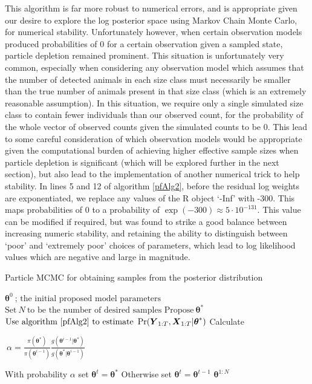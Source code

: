 \documentclass[a4paper,12pt]{article}
\begin{document}
This algorithm is far more robust to numerical errors, and is appropriate given our desire to explore the log posterior space using Markov Chain Monte Carlo, for numerical stability. Unfortunately however, when certain observation models produced probabilities of 0 for a certain observation given a sampled state, particle depletion remained prominent. This situation is unfortunately very common, especially when considering any observation model which assumes that the number of detected animals in each size class must necessarily be smaller than the true number of animals present in that size class (which is an extremely reasonable assumption). In this situation, we require only a single simulated size class to contain fewer individuals than our observed count, for the probability of the whole vector of observed counts given the simulated counts to be 0. This lead to some careful consideration of which observation models would be appropriate given the computational burden of achieving higher effective sample sizes when particle depletion is significant (which will be explored further in the next section), but also lead to the implementation of another numerical trick to help stability. In lines 5 and 12 of algorithm \ref{pfAlg2}, before the residual log weights are exponentiated, we replace any values of the R object `-Inf' with -300. This maps probabilities of 0 to a probability of $\exp(-300)\approx 5\cdot 10^{-131}$. This value can be modified if required, but was found to strike a good balance between increasing numeric stability, and retaining the ability to distinguish between `poor' and `extremely poor' choices of parameters, which lead to log likelihood values which are negative and large in magnitude.\\

\begin{algorithm}[H]
\caption{\label{pmcmcAlg} Particle MCMC for obtaining samples from the posterior distribution}
\begin{algorithmic}[1]
\begin{spacing}{2}
\REQUIRE $\boldsymbol{\theta}^0 \ \text{; the initial proposed model parameters}$
\STATE $\text{Set} \ N \ \text{to be the number of desired samples}$
    \STATE $\text{Propose} \ \boldsymbol{\theta}^{*} $
    \STATE $\text{Use algorithm \ref{pfAlg2} to estimate} \
    \Pr(\boldsymbol{Y}_{1:T} , \boldsymbol{X}_{1:T} | \boldsymbol{\theta}^{*})$
    \STATE Calculate \begin{Large}$\ \alpha = \frac{\pi(\boldsymbol{\theta}^{*})}{\pi(\boldsymbol{\theta}^{i-1})}\frac{g\left(\boldsymbol{\theta}^{i-1}|\boldsymbol{\theta}^{*}\right)}{g\left(\boldsymbol{\theta}^{*}|\boldsymbol{\theta}^{i-1}\right)}$\end{Large}
    \STATE With probability $\alpha$ set $\boldsymbol{\theta}^{t} = \boldsymbol{\theta}^{*}$
    \STATE Otherwise set $\boldsymbol{\theta}^{t} = \boldsymbol{\theta}^{t-1} $
\ENDFOR
\RETURN $\boldsymbol{\theta}^{1:N}$
\end{spacing}
\end{algorithmic}
\end{algorithm}
\end{document}
